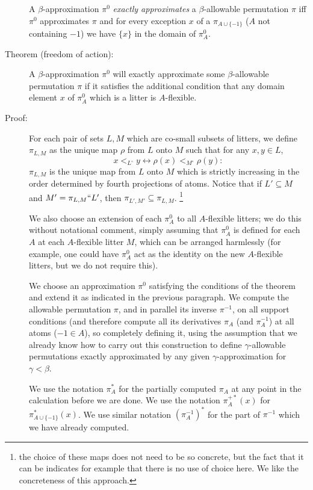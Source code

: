 \documentclass[112pt]{article}
\begin{document}
\begin{description}
A $\beta$-approximation $\pi^0$ {\em exactly approximates\/} a $\beta$-allowable permutation $\pi$ iff $\pi^0$ approximates $\pi$ and
for every exception $x$ of a $\pi_{A \cup \{-1\}}$ ($A$ not containing $-1$) we have $\{x\}$ in the domain of $\pi^0_A$.

\item[Theorem (freedom of action):]  A $\beta$-approximation $\pi^0$ will exactly approximate some $\beta$-allowable permutation $\pi$ if it satisfies the additional condition that any domain element $x$ of $\pi^0_A$ which is a litter is $A$-flexible.

\item[Proof:]   For each pair of sets $L,M$ which are co-small subsets of litters, we define $\pi_{L,M}$ as the unique map $\rho$ from $L$ onto $M$ such
that for any $x,y \in L$, $$x <_{L^{\circ}} y \leftrightarrow \rho(x) <_{M^\circ} \rho(y):$$  $\pi_{L,M}$ is the unique map from $L$ onto $M$ which is strictly increasing in the order determined by fourth projections of atoms.  Notice that if $L' \subseteq M$ and $M' = \pi_{L,M}``L'$, then $\pi_{L',M'} \subseteq \pi_{L,M}$.  \footnote{the choice of these maps does not need to be so concrete, but the fact that it can be indicates for example that there is no use of choice here.  We like the concreteness of this approach.}

We also choose an extension of each  $\pi^0_A$ to all $A$-flexible litters;  we do this without notational comment, simply assuming that $\pi^0_A$ is defined for each $A$ at each $A$-flexible litter $M$, which can be arranged harmlessly
(for example, one could have $\pi^0_A$ act as the identity on the new $A$-flexible litters, but we do not require this).

We choose an approximation $\pi^0$ satisfying the conditions of the theorem and extend it as indicated in the previous paragraph.  We compute the allowable permutation $\pi$, and in parallel its inverse $\pi^{-1}$, on
all support conditions (and therefore compute all its derivatives $\pi_A$ (and $\pi^{-1}_A$) at all atoms ($-1 \in A$), so completely defining it, using the assumption that we already know how to carry out this construction to
define $\gamma$-allowable permutations exactly approximated by any given $\gamma$-approximation for $\gamma<\beta$.

We use the notation $\pi^*_A$ for the partially computed $\pi_A$ at any point in the calculation before we are done. 
We use the notation $\pi^{+*}_A(x)$ for $\pi^*_{A \cup \{-1\}}(x)$.
 We use similar notation $(\pi^{-1}_A)^*$ for the part of $\pi^{-1}$ which we have already computed.


\end{description}
\end{document}
